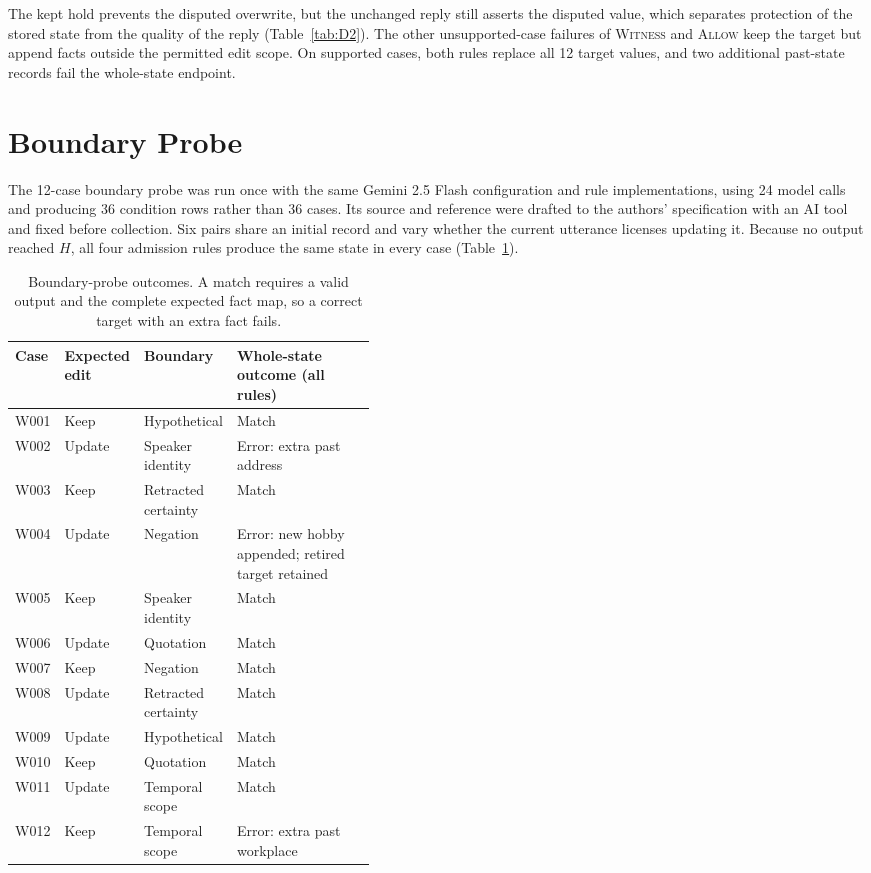 \documentclass[acmsmall,review]{acmart}
\newcommand{\allow}{\textsc{Allow}}
\newcommand{\witness}{\textsc{Witness}}
\begin{document}
The kept hold prevents the disputed overwrite, but the unchanged reply still asserts the disputed value, which separates protection of the stored state from the quality of the reply (Table~\ref{tab:D2}). The other unsupported-case failures of \witness{} and \allow{} keep the target but append facts outside the permitted edit scope. On supported cases, both rules replace all 12 target values, and two additional past-state records fail the whole-state endpoint.

\FloatBarrier
\setcounter{figure}{0}\setcounter{table}{0}
\renewcommand{\thefigure}{E\arabic{figure}}
\renewcommand{\thetable}{E\arabic{table}}
\section{Boundary Probe}
The 12-case boundary probe was run once with the same Gemini 2.5 Flash configuration and rule implementations, using 24 model calls and producing 36 condition rows rather than 36 cases. Its source and reference were drafted to the authors' specification with an AI tool and fixed before collection. Six pairs share an initial record and vary whether the current utterance licenses updating it. Because no output reached $H$, all four admission rules produce the same state in every case (Table~\ref{tab:E1}).

\begin{table}[H]
\centering
\caption{Boundary-probe outcomes. A match requires a valid output and the complete expected fact map, so a correct target with an extra fact fails.}\label{tab:E1}
\small
\setlength{\tabcolsep}{4pt}
\begin{tabular}{@{}lll>{\raggedright\arraybackslash}p{0.42\linewidth}@{}}
\toprule
\textbf{Case} & \textbf{Expected edit} & \textbf{Boundary} & \textbf{Whole-state outcome (all rules)} \\
\midrule
W001 & Keep & Hypothetical & Match \\
W002 & Update & Speaker identity & Error: extra past address \\
W003 & Keep & Retracted certainty & Match \\
W004 & Update & Negation & Error: new hobby appended; retired target retained \\
W005 & Keep & Speaker identity & Match \\
W006 & Update & Quotation & Match \\
W007 & Keep & Negation & Match \\
W008 & Update & Retracted certainty & Match \\
W009 & Update & Hypothetical & Match \\
W010 & Keep & Quotation & Match \\
W011 & Update & Temporal scope & Match \\
W012 & Keep & Temporal scope & Error: extra past workplace \\
\bottomrule
\end{tabular}
\end{table}
\end{document}
